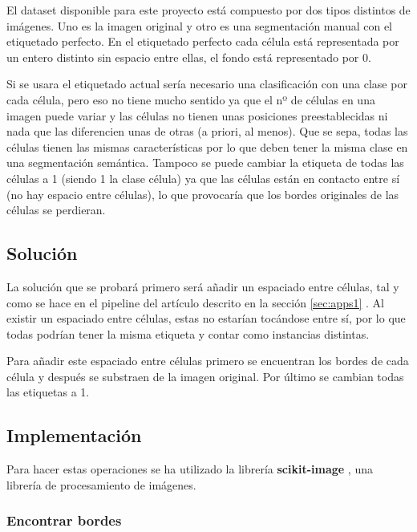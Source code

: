 El dataset disponible para este proyecto está compuesto por dos tipos distintos de imágenes. Uno es la imagen original y otro es una segmentación manual con el etiquetado perfecto. En el etiquetado perfecto cada célula está representada por un entero distinto sin espacio entre ellas, el fondo está representado por 0.

Si se usara el etiquetado actual sería necesario una clasificación con una clase por cada célula, pero eso no tiene mucho sentido ya que el nº de células en una imagen puede variar y las células no tienen unas posiciones preestablecidas ni nada que las diferencien unas de otras (a priori, al menos). Que se sepa, todas las células tienen las mismas características por lo que deben tener la misma clase en una segmentación semántica. Tampoco se puede cambiar la etiqueta de todas las células a 1 (siendo 1 la clase célula) ya que las células están en contacto entre sí (no hay espacio entre células), lo que provocaría que los bordes originales de las células se perdieran.

\subsection{Solución}\label{subsec:multi_problem}

La solución que se probará primero será añadir un espaciado entre células, tal y como se hace en el pipeline del artículo descrito en la sección \ref{sec:apps1} \cite{Falk2019}. Al existir un espaciado entre células, estas no estarían tocándose entre sí, por lo que todas podrían tener la misma etiqueta y contar como instancias distintas.

Para añadir este espaciado entre células primero se encuentran los bordes de cada célula y después se substraen de la imagen original. Por último se cambian todas las etiquetas a 1.

\subsection{Implementación}\label{subsec:multi_implementation}

Para hacer estas operaciones se ha utilizado la librería \textbf{scikit-image} \cite{Walt2014}, una librería de procesamiento de imágenes.

\subsubsection{Encontrar bordes}\label{subsubsec:multi_find_borders}

